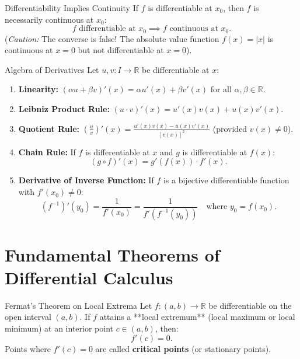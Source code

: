 \begin{theorembox}{Differentiability Implies Continuity}
If $f$ is differentiable at $x_0$, then $f$ is necessarily continuous at $x_0$:
\begin{equation}
f \text{ differentiable at } x_0 \implies f \text{ continuous at } x_0.
\end{equation}
(\textit{Caution:} The converse is false! The absolute value function $f(x) = |x|$ is continuous at $x = 0$ but not differentiable at $x = 0$).
\end{theorembox}

\begin{propbox}{Algebra of Derivatives}
Let $u, v: I \longrightarrow \mathbb{R}$ be differentiable at $x$:
\begin{enumerate}[leftmargin=1.4em,itemsep=2pt]
  \item \textbf{Linearity:} $(\alpha u + \beta v)'(x) = \alpha u'(x) + \beta v'(x)$ for all $\alpha, \beta \in \mathbb{R}$.
  \item \textbf{Leibniz Product Rule:} $(u \cdot v)'(x) = u'(x) v(x) + u(x) v'(x)$.
  \item \textbf{Quotient Rule:} $\left( \frac{u}{v} \right)'(x) = \frac{u'(x) v(x) - u(x) v'(x)}{[v(x)]^2}$ (provided $v(x) \neq 0$).
  \item \textbf{Chain Rule:} If $f$ is differentiable at $x$ and $g$ is differentiable at $f(x)$:
  \[
  (g \circ f)'(x) = g'(f(x)) \cdot f'(x).
  \]
  \item \textbf{Derivative of Inverse Function:} If $f$ is a bijective differentiable function with $f'(x_0) \neq 0$:
  \[
  (f^{-1})'(y_0) = \frac{1}{f'(x_0)} = \frac{1}{f'(f^{-1}(y_0))} \quad \text{where } y_0 = f(x_0).
  \]
\end{enumerate}
\end{propbox}

\section{Fundamental Theorems of Differential Calculus}

\begin{theorembox}{Fermat's Theorem on Local Extrema}
Let $f: (a, b) \longrightarrow \mathbb{R}$ be differentiable on the open interval $(a, b)$.
If $f$ attains a **local extremum** (local maximum or local minimum) at an interior point $c \in (a, b)$, then:
\begin{equation}
f'(c) = 0.
\end{equation}
Points where $f'(c) = 0$ are called \textbf{critical points} (or stationary points).
\end{theorembox}

